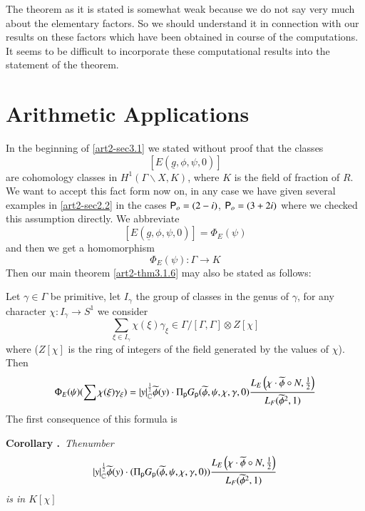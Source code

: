 \begin{remark*}
The theorem as it is stated is somewhat weak because we do not say very much about the elementary factors. So we should understand it in connection with our results on these factors which have been obtained in course of the computations. It seems to be difficult to incorporate these computational results into the statement of the theorem.
\end{remark*}

\section{Arithmetic Applications}\label{art2-sec4}


In the beginning of \ref{art2-sec3.1} we stated without proof that the classes 
$$
[E(\underline{g},\phi,\psi,0)]
$$ 
are cohomology classes in $H^{1}(\Gamma\backslash X,K)$, where $K$ is the field of fraction of $R$. We want to accept this fact form now on, in any case we have given several examples in \ref{art2-sec2.2} in the cases $\mathsf{P}_{o}=(2-i)$, $\mathsf{P}_{o}=(3+2i)$ where we checked this assumption directly. We abbreviate
$$
[E(\underline{g},\phi,\psi,0)]=\Phi_{E}(\psi)
$$
and then we get a homomorphism
$$
\Phi_{E}(\psi):\Gamma\to K
$$
Then our main theorem \ref{art2-thm3.1.6} may also be stated as follows:

Let $\gamma\in \Gamma$ be primitive, let $I_{\gamma}$ the group of classes in the genus of $\gamma$, for any character $\chi:I_{\gamma}\to S^{1}$ we consider
$$
\sum\limits_{\xi\in I_{\gamma}}\chi(\xi)\gamma_{\xi}\in \Gamma/[\Gamma,\Gamma]\otimes Z[\chi]
$$
where ($Z[\chi]$ is the ring of integers of the field generated by the values of $\chi$). Then
$$
\Phi_{E}(\psi)(\sum \chi(\xi)\gamma_{\xi})=|y|_{\mathbb{C}}^{\frac{1}{2}}\widetilde{\phi}(y)\cdot \Pi_{\mathsf{p}}G_{\mathsf{p}}(\widetilde{\phi},\psi,\chi,\gamma,0)\frac{L_{E}\left(\chi\cdot \widetilde{\phi}\circ N,\frac{1}{2}\right)}{L_{F}(\widetilde{\phi}^{2},1)}
$$
The first consequence of this formula is

\medskip
\noindent
{\bf Corollary .\label{art2-coro4.1}}~{\em The\pageoriginale number}
$$
|y|^{\frac{1}{2}}_{\mathbb{C}}\widetilde{\phi}(y)\cdot (\Pi_{\mathsf{p}}G_{\mathsf{p}}(\widetilde{\phi},\psi,\chi,\gamma,0))\frac{L_{E}\left(\chi\cdot \widetilde{\phi}\circ N,\frac{1}{2}\right)}{L_{F}(\widetilde{\phi}^{2},1)}
$$
{\em is in $K[\chi]$}
\smallskip


